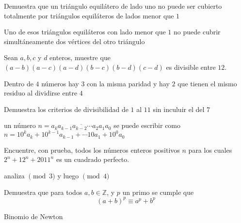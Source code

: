 \documentclass[11pt]{scrartcl}
\begin{document}
\vspace{0.1cm}
\begin{problem}
Demuestra que un triángulo equilátero de lado uno no puede ser cubierto totalmente por triángulos equiláteros de lados menor que $1$
    \begin{hint}
       Uno de esos triángulos equiláteros con lado menor que $1$ no puede cubrir simultáneamente dos vértices del otro triángulo
    \end{hint}
\end{problem}
\vspace{0.1cm}
\begin{problem}
Sean $a, b, c$ y $d$ enteros, muestre que $(a-b)(a-c)(a-d)(b-c)(b-d)(c-d)$ es
divisible entre $12$.

    \begin{hint}
        Dentro de $4$ números hay $3$ con la misma paridad y hay $2$ que tienen el mismo residuo al dividirse entre $4$
    \end{hint}
\end{problem}
\vspace{0.1cm}
\begin{problem}
    Demuestra los criterios de divisibilidad de $1$ al $11$ sin inculuir el del $7$
    \begin{hint}
         un número $n=\overline{a_ka_{k-1}a_{k-2}\cdots a_2a_1a_0}$ se puede escribir como $n=10^{k}a_k+10^{k-1}a_{k-1}+\cdots 10a_1+10^{0}a_0$
    \end{hint}
\end{problem}
\vspace{0.1cm}
\begin{problem}
Encuentre, con prueba, todos los números enteros positivos $n$ para los cuales $2^n + 12^n + 2011^n$ es un cuadrado perfecto.
  \begin{hint}
  analiza $\pmod 3$ y luego $\pmod 4$
  \end{hint}
\end{problem}
\vspace{0.1cm}
\begin{problem}
    Demuestra que para todos $a,b\in \mathbb{Z}$, y $p$ un primo se cumple que 
    \[(a+b)^p\equiv a^p+b^p\]
    \begin{hint}
        Binomio de Newton
    \end{hint}
\end{problem}
\vspace{0.1cm}
\end{document}

